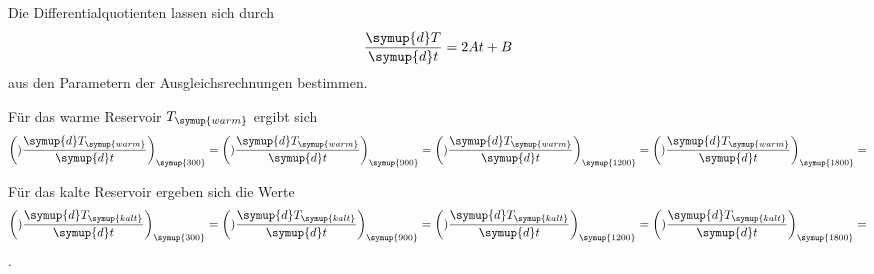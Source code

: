 Die Differentialquotienten lassen sich durch
\begin{equation}
  \frac{\symup{d}T}{\symup{d}t}=2At+B
\end{equation}
aus den Parametern der Ausgleichsrechnungen bestimmen.

Für das warme Reservoir $T_{\symup{warm}}$ ergibt sich
\begin{align*}
  \biggl()\frac{\symup{d}T_{\symup{warm}}}{\symup{d}t}\biggr)_{\symup{300}} =
  \biggl()\frac{\symup{d}T_{\symup{warm}}}{\symup{d}t}\biggr)_{\symup{900}} =
  \biggl()\frac{\symup{d}T_{\symup{warm}}}{\symup{d}t}\biggr)_{\symup{1200}} =
  \biggl()\frac{\symup{d}T_{\symup{warm}}}{\symup{d}t}\biggr)_{\symup{1800}} =
\end{align*}


Für das kalte Reservoir ergeben sich die Werte
\begin{align*}
  \biggl()\frac{\symup{d}T_{\symup{kalt}}}{\symup{d}t}\biggr)_{\symup{300}} =
  \biggl()\frac{\symup{d}T_{\symup{kalt}}}{\symup{d}t}\biggr)_{\symup{900}} =
  \biggl()\frac{\symup{d}T_{\symup{kalt}}}{\symup{d}t}\biggr)_{\symup{1200}} =
  \biggl()\frac{\symup{d}T_{\symup{kalt}}}{\symup{d}t}\biggr)_{\symup{1800}} =
\end{align*}
.
